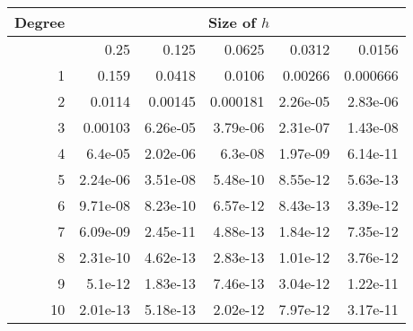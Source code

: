 \begin{tabular}{|r|r|r|r|r|r|}    
    \hline
    Degree &        \multicolumn{5}{c|}{Size of $h$}          \\

    \hline
        & 0.25     & 0.125    & 0.0625   & 0.0312   & 0.0156  \\
    \hline
    1  & 0.159    & 0.0418   & 0.0106   & 0.00266  & 0.000666 \\
    \hline
    2  & 0.0114   & 0.00145  & 0.000181 & 2.26e-05 & 2.83e-06 \\
    \hline
    3  & 0.00103  & 6.26e-05 & 3.79e-06 & 2.31e-07 & 1.43e-08 \\
    \hline
    4  & 6.4e-05  & 2.02e-06 & 6.3e-08  & 1.97e-09 & 6.14e-11 \\
    \hline
    5  & 2.24e-06 & 3.51e-08 & 5.48e-10 & 8.55e-12 & 5.63e-13 \\
    \hline
    6  & 9.71e-08 & 8.23e-10 & 6.57e-12 & 8.43e-13 & 3.39e-12 \\
    \hline
    7  & 6.09e-09 & 2.45e-11 & 4.88e-13 & 1.84e-12 & 7.35e-12 \\
    \hline
    8  & 2.31e-10 & 4.62e-13 & 2.83e-13 & 1.01e-12 & 3.76e-12 \\
    \hline
    9  & 5.1e-12  & 1.83e-13 & 7.46e-13 & 3.04e-12 & 1.22e-11 \\
    \hline
    10 & 2.01e-13 & 5.18e-13 & 2.02e-12 & 7.97e-12 & 3.17e-11 \\
    \hline
\end{tabular}

